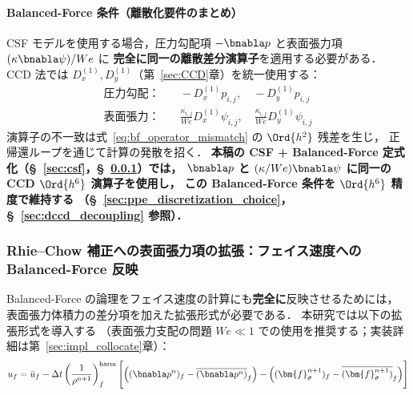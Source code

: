 \paragraph{Balanced-Force 条件（離散化要件のまとめ）}
CSF モデルを使用する場合，圧力勾配項 $-\bnabla p$ と表面張力項 $(\kappa\bnabla\psi)/We$ に
\textbf{完全に同一の離散差分演算子}を適用する必要がある．
CCD 法では $D_x^{(1)}, D_y^{(1)}$（第~\ref{sec:CCD}章）を統一使用する：
\begin{align}
  \text{圧力勾配：} & \quad
    -D_x^{(1)} p_{i,j}, \quad -D_y^{(1)} p_{i,j}
    \label{eq:balanced_pressure} \\
  \text{表面張力：} & \quad
    \frac{\kappa_{i,j}}{We} D_x^{(1)} \psi_{i,j}, \quad
    \frac{\kappa_{i,j}}{We} D_y^{(1)} \psi_{i,j}
    \label{eq:balanced_surface}
\end{align}
演算子の不一致は式~\eqref{eq:bf_operator_mismatch} の $\Ord{h^2}$ 残差を生じ，
正帰還ループを通じて計算の発散を招く．
\textbf{本稿の CSF + Balanced-Force 定式化（§~\ref{sec:csf}，§~\ref{sec:rc_balanced_force}）では，
$\bnabla p$ と $(\kappa/We)\bnabla\psi$ に同一の CCD $\Ord{h^6}$ 演算子を使用し，
この Balanced-Force 条件を $\Ord{h^6}$ 精度で維持する
（§~\ref{sec:ppe_discretization_choice}，§~\ref{sec:dccd_decoupling} 参照）．}

\subsubsection{Rhie--Chow 補正への表面張力項の拡張：フェイス速度への Balanced-Force 反映}
\label{sec:rc_balanced_force}

Balanced-Force の論理をフェイス速度の計算にも\textbf{完全に}反映させるためには，
表面張力体積力の差分項を加えた拡張形式が必要である．
本研究では以下の拡張形式を導入する
（表面張力支配の問題 $We \ll 1$ での使用を推奨する；実装詳細は第~\ref{sec:impl_collocate}章）：
\begin{equation}
  u_f = \bar{u}_f
    - \Delta t\left(\frac{1}{\rho^{n+1}}\right)_f^{\mathrm{harm}}
    \Biggl[
      \Bigl((\bnabla p^n)_f - \overline{(\bnabla p^n)}_f\Bigr)
      - \Bigl((\bm{f}_\sigma^{n+1})_f - \overline{(\bm{f}_\sigma^{n+1})}_f\Bigr)
    \Biggr]
  \label{eq:rc-face-balanced}
\end{equation}


